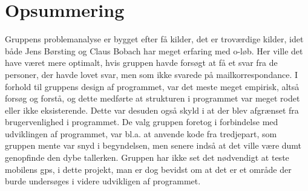\section{Opsummering}
Gruppens problemanalyse er bygget efter få kilder, det er troværdige kilder, idet både Jens Børsting og Claus Bobach har meget erfaring med o-løb. Her ville det have været mere optimalt, hvis gruppen havde forsøgt at få et svar fra de personer, der havde lovet svar, men som ikke svarede på mailkorrespondance. \newline
I forhold til gruppens design af programmet, var det meste meget empirisk, altså forsøg og forstå, og dette medførte at strukturen i programmet var meget rodet eller ikke eksisterende. Dette var desuden også skyld i at der blev afgrænset fra brugervenlighed i programmet. \newline
De valg gruppen foretog i forbindelse med udviklingen af programmet, var bl.a. at anvende kode fra tredjepart, som gruppen mente var snyd i begyndelsen, men senere indså at det ville være dumt genopfinde den dybe tallerken.
Gruppen har ikke set det nødvendigt at teste mobilens gps, i dette projekt, man er dog bevidst om at det er et område der burde undersøges i videre udvikligen af programmet.

